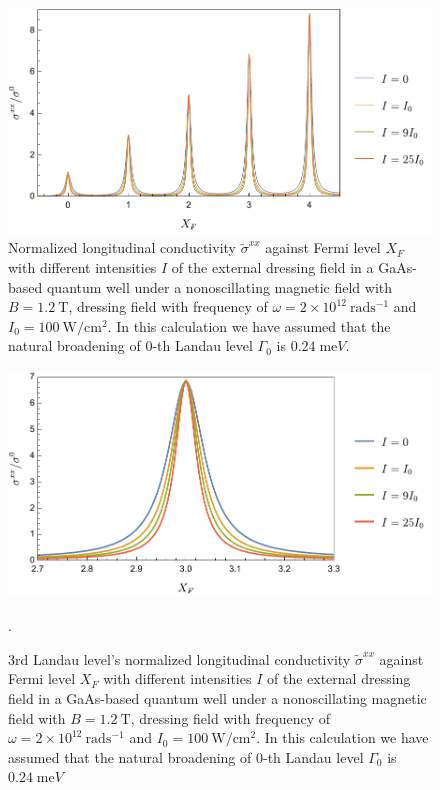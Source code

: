 \begin{figure}[t]
\includegraphics[scale=0.55]{figures/fig_5}
\caption{\label{fig_5} Normalized longitudinal conductivity $\tilde{\sigma}^{xx}$ against Fermi level $X_F$ with different intensities $I$ of the external dressing field in a GaAs-based quantum well under a nonoscillating magnetic field with $B = 1.2~\text{T}$, dressing field with frequency of $\omega =2\times10^{12}~\text{rad}\text{s}^{-1}$ and $I_0 =100~\text{W}/\text{cm}^{2}$. In this calculation we have assumed that the natural  broadening of $0$-th Landau level $\Gamma_0$ is $0.24\;\text{me}V$.}
\end{figure}
\begin{figure}[t]
\includegraphics[scale=0.55]{figures/fig_6}
\caption{\label{fig_6} $3$rd Landau level’s normalized longitudinal conductivity $\tilde{\sigma}^{xx}$ against Fermi level $X_F$ with different intensities $I$ of the external dressing field in a GaAs-based quantum well under a nonoscillating magnetic field with $B = 1.2~\text{T}$, dressing field with frequency of $\omega =2\times10^{12}~\text{rad}\text{s}^{-1}$ and $I_0 =100~\text{W}/\text{cm}^{2}$. In this calculation we have assumed that the natural  broadening of $0$-th Landau level $\Gamma_0$ is $0.24\;\text{me}V$}.
\end{figure}

